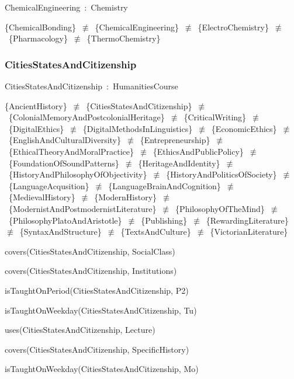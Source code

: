 \documentclass{article}
\begin{document}
ChemicalEngineering~:~Chemistry

\{ChemicalBonding\}~\ensuremath{\not\equiv}~\{ChemicalEngineering\}~\ensuremath{\not\equiv}~\{ElectroChemistry\}~\ensuremath{\not\equiv}~\{Pharmacology\}~\ensuremath{\not\equiv}~\{ThermoChemistry\}

\subsubsection*{CitiesStatesAndCitizenship}

CitiesStatesAndCitizenship~:~HumanitiesCourse

\{AncientHistory\}~\ensuremath{\not\equiv}~\{CitiesStatesAndCitizenship\}~\ensuremath{\not\equiv}~\{ColonialMemoryAndPostcolonialHeritage\}~\ensuremath{\not\equiv}~\{CriticalWriting\}~\ensuremath{\not\equiv}~\{DigitalEthics\}~\ensuremath{\not\equiv}~\{DigitalMethodsInLinguistics\}~\ensuremath{\not\equiv}~\{EconomicEthics\}~\ensuremath{\not\equiv}~\{EnglishAndCulturalDiversity\}~\ensuremath{\not\equiv}~\{Entrepreneurship\}~\ensuremath{\not\equiv}~\{EthicalTheoryAndMoralPractice\}~\ensuremath{\not\equiv}~\{EthicsAndPublicPolicy\}~\ensuremath{\not\equiv}~\{FoundationOfSoundPatterns\}~\ensuremath{\not\equiv}~\{HeritageAndIdentity\}~\ensuremath{\not\equiv}~\{HistoryAndPhilosophyOfObjectivity\}~\ensuremath{\not\equiv}~\{HistoryAndPoliticsOfSociety\}~\ensuremath{\not\equiv}~\{LanguageAcqusition\}~\ensuremath{\not\equiv}~\{LanguageBrainAndCognition\}~\ensuremath{\not\equiv}~\{MedievalHistory\}~\ensuremath{\not\equiv}~\{ModernHistory\}~\ensuremath{\not\equiv}~\{ModernistAndPostmodernistLiterature\}~\ensuremath{\not\equiv}~\{PhilosophyOfTheMind\}~\ensuremath{\not\equiv}~\{PhilosophyPlatoAndAristotle\}~\ensuremath{\not\equiv}~\{Publishing\}~\ensuremath{\not\equiv}~\{RewardingLiterature\}~\ensuremath{\not\equiv}~\{SyntaxAndStructure\}~\ensuremath{\not\equiv}~\{TextsAndCulture\}~\ensuremath{\not\equiv}~\{VictorianLiterature\}

covers(CitiesStatesAndCitizenship, SocialClass)

covers(CitiesStatesAndCitizenship, Institutions)

isTaughtOnPeriod(CitiesStatesAndCitizenship, P2)

isTaughtOnWeekday(CitiesStatesAndCitizenship, Tu)

uses(CitiesStatesAndCitizenship, Lecture)

covers(CitiesStatesAndCitizenship, SpecificHistory)

isTaughtOnWeekday(CitiesStatesAndCitizenship, Mo)
\end{document}
